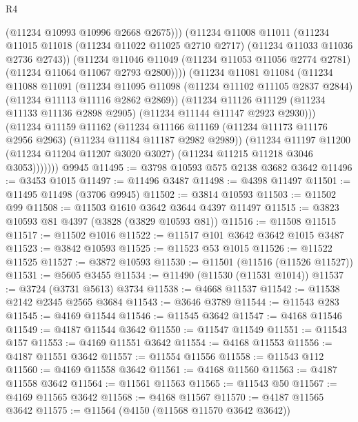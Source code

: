 \begin{lexlean}{R4}
\begin{coremodule}
                (@11234 @10993 @10996 @2668 @2675)))
            (@11234
              @11008
              @11011
              (@11234
                @11015
                @11018
                (@11234 @11022 @11025 @2710 @2717)
                (@11234 @11033 @11036 @2736 @2743))
              (@11234
                @11046
                @11049
                (@11234 @11053 @11056 @2774 @2781)
                (@11234 @11064 @11067 @2793 @2800))))
          (@11234
            @11081
            @11084
            (@11234
              @11088
              @11091
              (@11234
                @11095
                @11098
                (@11234 @11102 @11105 @2837 @2844)
                (@11234 @11113 @11116 @2862 @2869))
              (@11234
                @11126
                @11129
                (@11234 @11133 @11136 @2898 @2905)
                (@11234 @11144 @11147 @2923 @2930)))
            (@11234
              @11159
              @11162
              (@11234
                @11166
                @11169
                (@11234 @11173 @11176 @2956 @2963)
                (@11234 @11184 @11187 @2982 @2989))
              (@11234
                @11197
                @11200
                (@11234 @11204 @11207 @3020 @3027)
                (@11234 @11215 @11218 @3046 @3053)))))))
    @9945
@11495 := @3798 @10593 @575 @2138 @3682 @3642
@11496 := @3453 @1015
@11497 := @11496 @3487
@11498 := @4398 @11497
@11501 := @11495 @11498 (@3706 @9945)
@11502 := @3814 @10593
@11503 := @11502 @99
@11508 := @11503 @1610 @3642 @3644 @4397 @11497
@11515 := @3823 @10593 @81 @4397 (@3828 (@3829 @10593 @81))
@11516 := @11508 @11515
@11517 := @11502 @1016
@11522 := @11517 @101 @3642 @3642 @1015 @3487
@11523 := @3842 @10593
@11525 := @11523 @53 @1015
@11526 := @11522 @11525
@11527 := @3872 @10593
@11530 := @11501 (@11516 (@11526 @11527))
@11531 := @5605 @3455
@11534 := @11490 (@11530 (@11531 @1014))
@11537 := @3724 (@3731 @5613) @3734
@11538 := @4668 @11537
@11542 := @11538 @2142 @2345 @2565 @3684
@11543 := @3646 @3789
@11544 := @11543 @283
@11545 := @4169 @11544
@11546 := @11545 @3642
@11547 := @4168 @11546
@11549 := @4187 @11544 @3642
@11550 := @11547 @11549
@11551 := @11543 @157
@11553 := @4169 @11551 @3642
@11554 := @4168 @11553
@11556 := @4187 @11551 @3642
@11557 := @11554 @11556
@11558 := @11543 @112
@11560 := @4169 @11558 @3642
@11561 := @4168 @11560
@11563 := @4187 @11558 @3642
@11564 := @11561 @11563
@11565 := @11543 @50
@11567 := @4169 @11565 @3642
@11568 := @4168 @11567
@11570 := @4187 @11565 @3642
@11575 := @11564 (@4150 (@11568 @11570 @3642 @3642))

\end{coremodule}
\end{lexlean}
